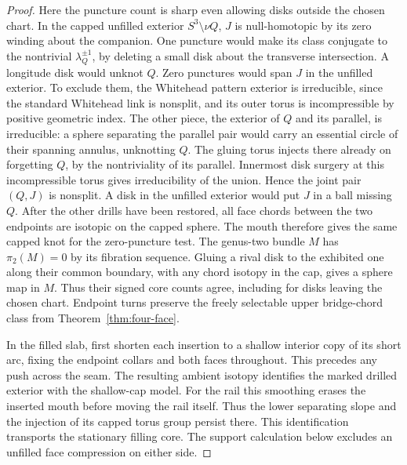 \documentclass[11pt,letterpaper]{article}
\numberwithin{equation}{section}
\theoremstyle{remark}
\begin{document}
\begin{proof}
Here the puncture count is sharp even allowing disks outside the
chosen chart. In the capped unfilled exterior \(S^3\setminus\nu Q\),
\(J\) is null-homotopic by its zero winding about the companion.
One puncture would make its class conjugate to the nontrivial
\(\lambda_Q^{\pm1}\), by deleting a small disk about the transverse
intersection. A longitude disk would unknot \(Q\). Zero punctures
would span \(J\) in the unfilled exterior. To exclude them, the
Whitehead pattern exterior is irreducible, since the standard
Whitehead link is nonsplit, and its outer torus is incompressible
by positive geometric index. The other piece, the exterior of \(Q\)
and its parallel, is irreducible: a sphere separating the parallel
pair would carry an essential circle of their spanning annulus,
unknotting \(Q\). The gluing torus injects there already on
forgetting \(Q\), by the nontriviality of its parallel. Innermost
disk surgery at this incompressible torus gives irreducibility
of the union. Hence the joint pair \((Q,J)\) is nonsplit. A disk
in the unfilled exterior would put \(J\) in a ball missing \(Q\).
After the other drills have been restored, all face chords between
the two endpoints are isotopic on the capped sphere. The mouth
therefore gives the same capped knot for the zero-puncture test.
The genus-two bundle \(M\) has \(\pi_2(M)=0\) by its fibration
sequence. Gluing a rival disk to the exhibited one along their
common boundary, with any chord isotopy in the cap, gives a sphere
map in \(M\). Thus their signed core counts agree, including for
disks leaving the chosen chart. Endpoint turns preserve the freely selectable
upper bridge-chord class from Theorem~\ref{thm:four-face}.

In the filled slab, first shorten each insertion to a shallow interior
copy of its short arc, fixing the endpoint collars and both faces
throughout. This precedes any push across the seam. The resulting
ambient isotopy identifies the marked drilled exterior with the
shallow-cap model. For the rail this smoothing erases the inserted
mouth before moving the rail itself. Thus the lower separating
slope and the injection of its capped torus group persist there.
This identification transports the stationary filling core. The support
calculation below excludes an unfilled face compression on either side.


\end{proof}
\end{document}
